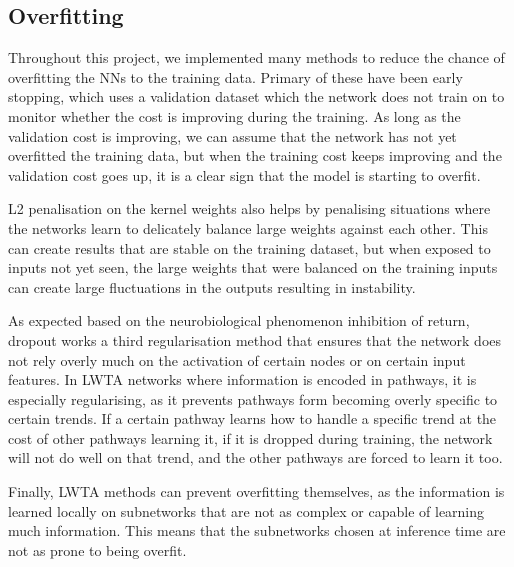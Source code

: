 

\subsection{Overfitting}
    Throughout this project, we implemented many methods to reduce the chance of overfitting the NNs to the training data. Primary of these have been early stopping, which uses a validation dataset which the network does not train on to monitor whether the cost is improving during the training. As long as the validation cost is improving, we can assume that the network has not yet overfitted the training data, but when the training cost keeps improving and the validation cost goes up, it is a clear sign that the model is starting to overfit.

    L2 penalisation on the kernel weights also helps by penalising situations where the networks learn to delicately balance large weights against each other. This can create results that are stable on the training dataset, but when exposed to inputs not yet seen, the large weights that were balanced on the training inputs can create large fluctuations in the outputs resulting in instability.

    As expected based on the neurobiological phenomenon inhibition of return, dropout works a third regularisation method that ensures that the network does not rely overly much on the activation of certain nodes or on certain input features. In LWTA networks where information is encoded in pathways, it is especially regularising, as it prevents pathways form becoming overly specific to certain trends. If a certain pathway learns how to handle a specific trend at the cost of other pathways learning it, if it is dropped during training, the network will not do well on that trend, and the other pathways are forced to learn it too.

    Finally, LWTA methods can prevent overfitting themselves, as the information is learned locally on subnetworks that are not as complex or capable of learning much information. This means that the subnetworks chosen at inference time are not as prone to being overfit.



